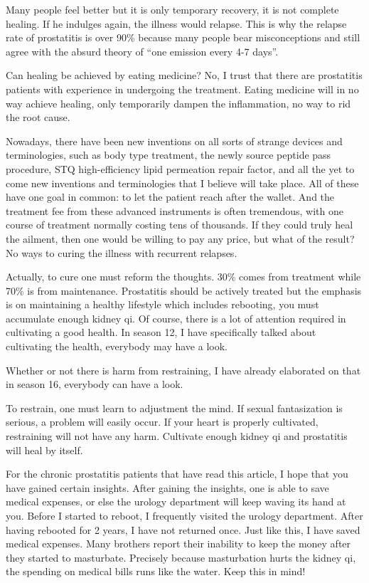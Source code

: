 \documentclass[
]{book}
\begin{document}
Many people feel better but it is only temporary recovery, it is not complete healing. If he indulges again, the illness would relapse. This is why the relapse rate of prostatitis is over 90\% because many people bear misconceptions and still agree with the absurd theory of ``one emission every 4-7 days''.

Can healing be achieved by eating medicine? No, I trust that there are prostatitis patients with experience in undergoing the treatment. Eating
medicine will in no way achieve healing, only temporarily dampen the inflammation, no way to rid the root cause.

Nowadays, there have been new inventions on all sorts of strange devices and terminologies, such as body type treatment, the newly source peptide pass procedure, STQ high-efficiency lipid permeation repair factor, and all the yet to come new inventions and terminologies that I believe will take place. All of these have one goal in common: to let the patient reach after the wallet. And the treatment fee from these advanced instruments is often tremendous, with one course of treatment normally costing tens of thousands. If they could truly heal the ailment, then one would be willing to pay any price, but what of the result? No ways to curing the illness with recurrent relapses.

Actually, to cure one must reform the thoughts. 30\% comes from treatment while 70\% is from maintenance. Prostatitis should be actively treated but the emphasis is on maintaining a healthy lifestyle which includes rebooting, you must accumulate enough kidney qi. Of course, there is a lot of attention required in cultivating a good health. In season 12, I have specifically talked about cultivating the health, everybody may have a look.

Whether or not there is harm from restraining, I have already elaborated on that in season 16, everybody can have a look.

To restrain, one must learn to adjustment the mind. If sexual fantasization is serious, a problem will easily occur. If your heart is properly cultivated, restraining will not have any harm. Cultivate enough kidney qi and prostatitis will heal by itself.

For the chronic prostatitis patients that have read this article, I hope that you have gained certain insights. After gaining the insights, one is able to save medical expenses, or else the urology department will keep waving its hand at you. Before I started to reboot, I frequently visited the urology department. After having rebooted for 2 years, I have not returned once. Just like this, I have saved medical expenses. Many brothers report their inability to keep the money after they started to masturbate. Precisely because masturbation hurts the kidney qi, the spending on medical bills runs like the water. Keep this in mind!
\end{document}
